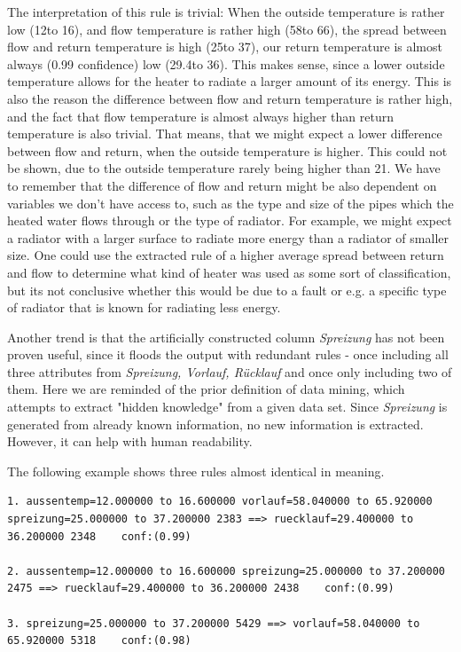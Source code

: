 \documentclass[bachelor,english]{info1thesis}
\begin{document}
The interpretation of this rule is trivial: When the outside temperature is rather low (12\textcelsius to 16\textcelsius), and flow temperature is rather high (58\textcelsius  to 66\textcelsius), the spread  between flow and return temperature is high (25\textcelsius  to 37\textcelsius), our return temperature is almost always (0.99 confidence) low (29.4\textcelsius  to 36\textcelsius). This makes sense, since a lower outside temperature allows for the heater to radiate a larger amount of its energy. This is also the reason the difference between flow and return temperature is rather high, and the fact that flow temperature is almost always higher than return temperature is also trivial. That means, that we might expect a lower difference between flow and return, when the outside temperature is higher. This could not be shown, due to the outside temperature rarely being higher than 21\textcelsius. We have to remember that the difference of flow and return might be also dependent on variables we don't have access to, such as the type and size of the pipes which the heated water flows through or the type of radiator. For example, we might expect a radiator with a larger surface to radiate more energy  than a radiator of smaller size. One could use the extracted rule of a higher average spread between return and flow to determine what kind of heater was used as some sort of classification, but its not conclusive whether this would be due to a fault or e.g. a specific type of radiator that is known for radiating less energy.


Another trend is that the artificially constructed column \textit{Spreizung} has not been proven useful, since it floods the output with redundant rules - once including all three attributes from \textit{Spreizung, Vorlauf, Rücklauf} and once only including two of them. Here we are reminded of the prior definition of data mining, which attempts to extract "hidden knowledge" from a given data set. Since \textit{Spreizung} is generated from already known information, no new information is extracted. However, it can help with human readability.

The following example shows three rules almost identical in meaning.

\begin{lstlisting}[style=arff, caption=redundant rules in N 100 C 0.01 M 0.05]
1. aussentemp=12.000000 to 16.600000 vorlauf=58.040000 to 65.920000 spreizung=25.000000 to 37.200000 2383 ==> ruecklauf=29.400000 to 36.200000 2348    conf:(0.99)
  
2. aussentemp=12.000000 to 16.600000 spreizung=25.000000 to 37.200000 2475 ==> ruecklauf=29.400000 to 36.200000 2438    conf:(0.99)

3. spreizung=25.000000 to 37.200000 5429 ==> vorlauf=58.040000 to 65.920000 5318    conf:(0.98)
\end{lstlisting}
\end{document}
